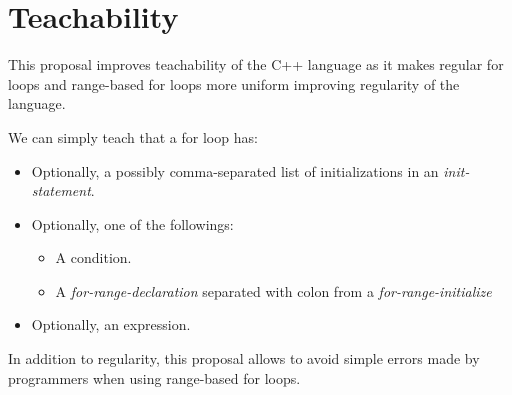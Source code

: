 \section{Teachability}

This proposal improves teachability of the C++ language as it makes regular for
loops and range-based for loops more uniform improving regularity of the
language.

We can simply teach that a for loop has:
\begin{itemize}
  \item Optionally, a possibly comma-separated list of initializations in an \emph{init-statement}.
  \item Optionally, one of the followings:
    \begin{itemize}
      \item A condition.
      \item A \emph{for-range-declaration} separated with colon from a
            \emph{for-range-initialize}
    \end{itemize}
  \item Optionally, an expression.
\end{itemize}

In addition to regularity, this proposal allows to avoid simple errors made by
programmers when using range-based for loops.

